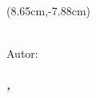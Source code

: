 \begin{titlepage}
\begin{textblock*}{7.35cm}(8.65cm,-7.88cm)%
    \color{GrisClaro}
    \begin{flushleft}
        {\fontsize{12pt}{14pt}
        {\addfontfeature{}
        {\textbf{\textit{\MakeUppercase\tipotrabajo}}}}}\\[0.49cm]
        {\fontsize{12pt}{14pt}
        {\addfontfeature{}
        Autor:}}\\ 
        {\fontsize{12pt}{14pt}
        {\addfontfeature{}
        {\textbf{\href{mailto:\emailprimero}{\nombreprimero}
        }}}}\\[0.5cm]
        {\fontsize{12pt}{14pt}
        {\addfontfeature{}
        {\textbf{\textit{\MakeUppercase \miUbicacion, \number\year}}}}}
    \end{flushleft}
\end{textblock*}

\end{titlepage} %

\restoregeometry